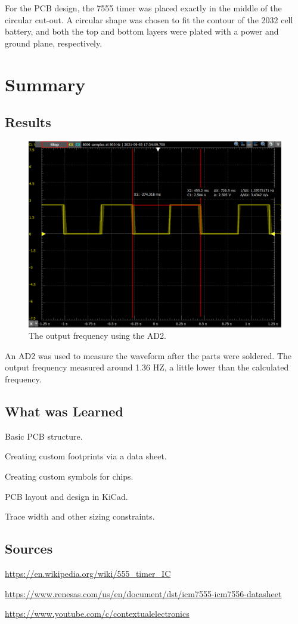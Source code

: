 \documentclass[10pt,twocolumn]{article}
\begin{document}
\noindent
For the PCB design, the 7555 timer was placed exactly in the middle of the circular cut-out. A circular shape was chosen to fit the contour of the 2032 cell battery, and both the top and bottom layers were plated with a power and ground plane, respectively.

\section{Summary}

\subsection{Results}

\begin{figure}[H]
	\centering
	\includegraphics[width=1\linewidth]{images/measured-waveform.png}
	\caption{The output frequency using the AD2.}
	\label{fig4}
\end{figure}

An AD2 was used to measure the waveform after the parts were soldered. The output frequency measured around 1.36 HZ, a little lower than the calculated frequency.


\subsection{What was Learned}
\begin{compactitem}
  \item Basic PCB structure.
  \item Creating custom footprints via a data sheet.
  \item Creating custom symbols for chips.
  \item PCB layout and design in KiCad.
  \item Trace width and other sizing constraints.
\end{compactitem}

\subsection{Sources}
\begin{compactitem}
  \item \url{https://en.wikipedia.org/wiki/555_timer_IC}
  \item \url{https://www.renesas.com/us/en/document/dst/icm7555-icm7556-datasheet}
  \item \url{https://www.youtube.com/c/contextualelectronics}
\end{compactitem}
\end{document}
